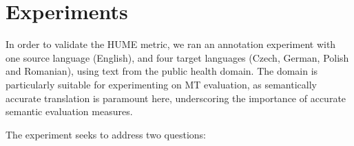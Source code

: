 \documentclass[11pt]{article}
\begin{document}
% 
% 
% 
% 
% 







\section{Experiments}\label{sec:experiments}


In order to validate the HUME metric, we ran an annotation experiment with one source language (English),
and four target languages (Czech, German, Polish and Romanian), using text from the public health domain.
The domain is particularly suitable for experimenting on MT evaluation, as semantically
accurate translation is paramount here, underscoring the importance of accurate
semantic evaluation measures.


The experiment seeks to address two questions:
\end{document}
